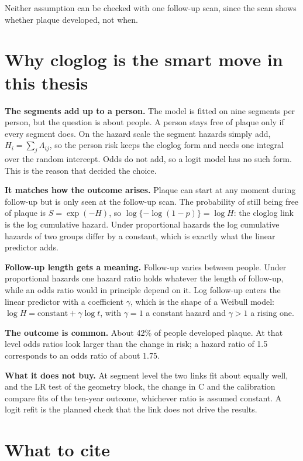 \documentclass[11pt]{article}
\begin{document}
Neither assumption can be checked with one follow-up scan, since the scan
shows whether plaque developed, not when.

\section*{Why cloglog is the smart move in this thesis}

\textbf{The segments add up to a person.} The model is fitted on nine
segments per person, but the question is about people. A person stays free of
plaque only if every segment does. On the hazard scale the segment hazards
simply add, $H_i = \sum_j \Lambda_{ij}$, so the person risk keeps the cloglog
form and needs one integral over the random intercept. Odds do not add, so a
logit model has no such form. This is the reason that decided the choice.

\textbf{It matches how the outcome arises.} Plaque can start at any moment
during follow-up but is only seen at the follow-up scan. The probability of
still being free of plaque is $S = \exp(-H)$, so
$\log\{-\log(1-p)\} = \log H$: the cloglog link is the log cumulative
hazard. Under proportional hazards the log cumulative hazards of two groups
differ by a constant, which is exactly what the linear predictor adds.

\textbf{Follow-up length gets a meaning.} Follow-up varies between people.
Under proportional hazards one hazard ratio holds whatever the length of
follow-up, while an odds ratio would in principle depend on it. Log
follow-up enters the linear predictor with a coefficient $\gamma$, which is
the shape of a Weibull model: $\log H = \text{constant} + \gamma \log t$,
with $\gamma = 1$ a constant hazard and $\gamma > 1$ a rising one.

\textbf{The outcome is common.} About 42\% of people developed plaque. At
that level odds ratios look larger than the change in risk; a hazard ratio
of 1.5 corresponds to an odds ratio of about 1.75.

\textbf{What it does not buy.} At segment level the two links fit about
equally well, and the LR test of the geometry block, the change in C and the
calibration compare fits of the ten-year outcome, whichever ratio is assumed
constant. A logit refit is the planned check that the link does not drive
the results.

\section*{What to cite}
\end{document}
